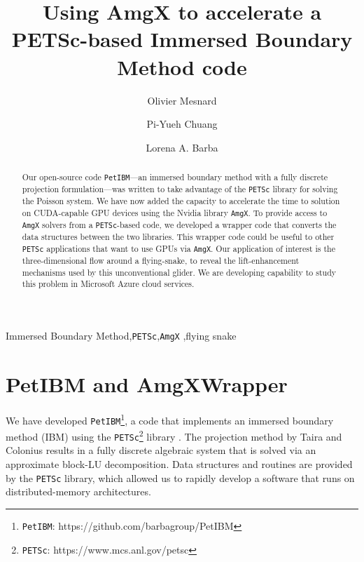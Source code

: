 \documentclass[review]{elsarticle}
\begin{document}
\begin{frontmatter}

\title{Using AmgX to accelerate a PETSc-based Immersed Boundary Method code}

\address[gwu]{Mechanical and Aerospace Engineering, The George Washington University, \\
Washington, DC, 20052, United-States}
\author[gwu]{Olivier Mesnard}
\author[gwu]{Pi-Yueh Chuang}
\author[gwu]{Lorena A. Barba}


\begin{abstract}
Our open-source code \texttt{PetIBM}---an immersed boundary method with a fully discrete projection formulation---was written to take advantage of the \texttt{PETSc} library for solving the Poisson system. 
We have now added the capacity to accelerate the time to solution on CUDA-capable GPU devices using the Nvidia library \texttt{AmgX}. 
To provide access to \texttt{AmgX} solvers from a \texttt{PETSc}-based code, we developed a wrapper code that converts the data structures between the two libraries.
This wrapper code could be useful to other \texttt{PETSc} applications that want to use GPUs via \texttt{AmgX}.
Our application of interest is the three-dimensional flow around a  flying-snake,  to reveal the lift-enhancement mechanisms used by this unconventional glider.
We are developing capability to study this problem in Microsoft Azure cloud services.
\end{abstract}

\begin{keyword}
Immersed Boundary Method\sep \texttt{PETSc}\sep \texttt{AmgX} \sep flying snake
\end{keyword}

\end{frontmatter}

\linenumbers

\section{PetIBM and AmgXWrapper}

We have developed \texttt{PetIBM}\footnote{\texttt{PetIBM}: https://github.com/barbagroup/PetIBM}, a code that implements an immersed boundary method (IBM) using the \texttt{PETSc}\footnote{\texttt{PETSc}: https://www.mcs.anl.gov/petsc} library .
The projection method by Taira and Colonius\cite{Taira_Colonius_2007} results in a fully discrete algebraic system that is solved via an approximate block-LU decomposition.
Data structures and routines are provided by the \texttt{PETSc} library, which allowed us to rapidly develop a software that runs on distributed-memory architectures.
\end{document}
